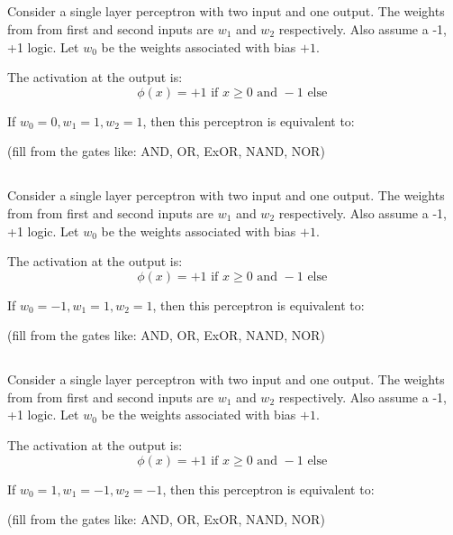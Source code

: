 \begin{frame}
\section{}
Consider a single layer perceptron with two input and one output. The weights from from first and second inputs are $w_1$ and $w_2$ respectively. Also assume a -1, +1 logic. Let $w_0$ be the weights associated with bias $+1$.



The activation at the output is:
\[ \phi(x) = +1 \mbox{ if } x\geq 0  \mbox{ and } -1 \mbox{ else }\]


If $w_0 = 0, w_1 = 1, w_2 = 1 $, then this perceptron is equivalent to:

(fill from the gates like: AND, OR, ExOR, NAND, NOR)


\end{frame}


\begin{frame}
\section{}
Consider a single layer perceptron with two input and one output. The weights from from first and second inputs are $w_1$ and $w_2$ respectively. Also assume a -1, +1 logic. Let $w_0$ be the weights associated with bias $+1$.



The activation at the output is:
\[ \phi(x) = +1 \mbox{ if } x\geq 0  \mbox{ and } -1 \mbox{ else }\]


If $w_0 = -1, w_1 = 1, w_2 = 1 $, then this perceptron is equivalent to:

(fill from the gates like: AND, OR, ExOR, NAND, NOR)



\end{frame}


\begin{frame}
\section{}
Consider a single layer perceptron with two input and one output. The weights from from first and second inputs are $w_1$ and $w_2$ respectively. Also assume a -1, +1 logic. Let $w_0$ be the weights associated with bias $+1$.



The activation at the output is:
\[ \phi(x) = +1 \mbox{ if } x\geq 0  \mbox{ and } -1 \mbox{ else }\]


If $w_0 = 1, w_1 = -1, w_2 = -1 $, then this perceptron is equivalent to:

(fill from the gates like: AND, OR, ExOR, NAND, NOR)



\end{frame}


